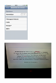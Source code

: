\documentclass{acm_proc_article-sp}
\newcommand{\thumbheight}{16mm}
\newcommand{\newstrip}{\\[1mm]}
\newenvironment{thumbsequence}{}{\makebox[4mm]{}}
\begin{document}
\begin{figure}
\begin{centering}
\begin{thumbsequence}
		\includegraphics[height=\thumbheight]{resources/free/looseduplicate4.jpg}
	\end{thumbsequence}
	\newstrip
	\begin{thumbsequence}
		\includegraphics[height=\thumbheight]{resources/free/looseduplicate12.jpg}

\end{thumbsequence}
\end{centering}
\end{figure}
\end{document}
